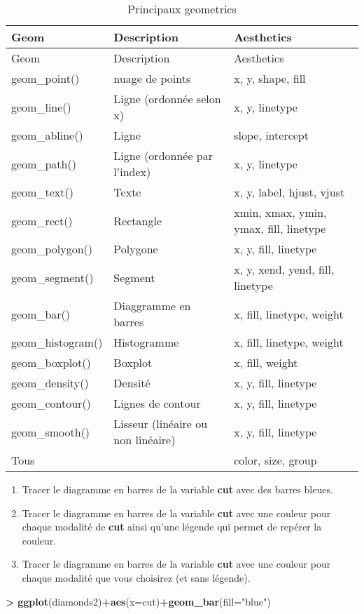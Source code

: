\documentclass[]{book}
\newenvironment{Shaded}{\begin{snugshade}}{\end{snugshade}}
\newcommand{\DataTypeTok}[1]{\textcolor[rgb]{0.13,0.29,0.53}{#1}}
\newcommand{\KeywordTok}[1]{\textcolor[rgb]{0.13,0.29,0.53}{\textbf{#1}}}
\newcommand{\NormalTok}[1]{#1}
\newcommand{\OperatorTok}[1]{\textcolor[rgb]{0.81,0.36,0.00}{\textbf{#1}}}
\newcommand{\StringTok}[1]{\textcolor[rgb]{0.31,0.60,0.02}{#1}}
\providecommand{\tightlist}{%
  \setlength{\itemsep}{0pt}\setlength{\parskip}{0pt}}
\theoremstyle{definition}
\theoremstyle{definition}
\theoremstyle{definition}
\theoremstyle{remark}
\let\BeginKnitrBlock\begin \let\EndKnitrBlock\end
\begin{document}
\begin{longtable}[]{@{}lll@{}}
\caption{\label{tab:geom} Principaux geometrics}\tabularnewline
\toprule
Geom & Description & Aesthetics\tabularnewline
\midrule
\endfirsthead
\toprule
Geom & Description & Aesthetics\tabularnewline
\midrule
\endhead
geom\_point() & nuage de points & x, y, shape, fill\tabularnewline
geom\_line() & Ligne (ordonnée selon x) & x, y, linetype\tabularnewline
geom\_abline() & Ligne & slope, intercept\tabularnewline
geom\_path() & Ligne (ordonnée par l'index) & x, y, linetype\tabularnewline
geom\_text() & Texte & x, y, label, hjust, vjust\tabularnewline
geom\_rect() & Rectangle & xmin, xmax, ymin, ymax, fill, linetype\tabularnewline
geom\_polygon() & Polygone & x, y, fill, linetype\tabularnewline
geom\_segment() & Segment & x, y, xend, yend, fill, linetype\tabularnewline
geom\_bar() & Diaggramme en barres & x, fill, linetype, weight\tabularnewline
geom\_histogram() & Histogramme & x, fill, linetype, weight\tabularnewline
geom\_boxplot() & Boxplot & x, fill, weight\tabularnewline
geom\_density() & Densité & x, y, fill, linetype\tabularnewline
geom\_contour() & Lignes de contour & x, y, fill, linetype\tabularnewline
geom\_smooth() & Lisseur (linéaire ou non linéaire) & x, y, fill, linetype\tabularnewline
Tous & & color, size, group\tabularnewline
\bottomrule
\end{longtable}

\BeginKnitrBlock{exercise}[Diagrammes en barres]
\protect\hypertarget{exr:exoggplot2}{}{\label{exr:exoggplot2} \iffalse (Diagrammes en barres) \fi{} }
\EndKnitrBlock{exercise}

\begin{enumerate}
\def\labelenumi{\arabic{enumi}.}
\tightlist
\item
  Tracer le diagramme en barres de la variable \textbf{cut} avec des barres bleues.
\item
  Tracer le diagramme en barres de la variable \textbf{cut} avec une couleur pour chaque modalité de \textbf{cut} ainsi qu'une légende qui permet de repérer la couleur.
\item
  Tracer le diagramme en barres de la variable \textbf{cut} avec une couleur pour chaque modalité que vous choisirez (et sans légende).
\end{enumerate}

\begin{Shaded}
\begin{Highlighting}[]
\OperatorTok{>}\StringTok{ }\KeywordTok{ggplot}\NormalTok{(diamonds2)}\OperatorTok{+}\KeywordTok{aes}\NormalTok{(}\DataTypeTok{x=}\NormalTok{cut)}\OperatorTok{+}\KeywordTok{geom_bar}\NormalTok{(}\DataTypeTok{fill=}\StringTok{"blue"}\NormalTok{)}
\end{Highlighting}
\end{Shaded}
\end{document}
